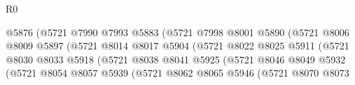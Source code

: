 \begin{lexlean}{R0}
\begin{coremodule}
                                          @5876
                                          (@5721
                                            @7990
                                            @7993
                                            @5883
                                            (@5721
                                              @7998
                                              @8001
                                              @5890
                                              (@5721
                                                @8006
                                                @8009
                                                @5897
                                                (@5721
                                                  @8014
                                                  @8017
                                                  @5904
                                                  (@5721
                                                    @8022
                                                    @8025
                                                    @5911
                                                    (@5721
                                                      @8030
                                                      @8033
                                                      @5918
                                                      (@5721
                                                        @8038
                                                        @8041
                                                        @5925
                                                        (@5721
                                                          @8046
                                                          @8049
                                                          @5932
                                                          (@5721
                                                            @8054
                                                            @8057
                                                            @5939
                                                            (@5721
                                                              @8062
                                                              @8065
                                                              @5946
                                                              (@5721
                                                                @8070
                                                                @8073

\end{coremodule}
\end{lexlean}
